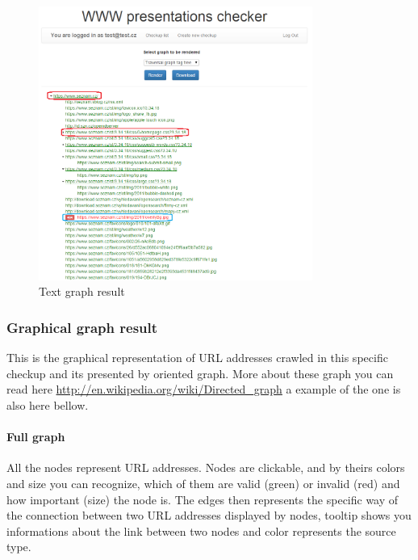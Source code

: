 \documentclass[12pt,a4paper]{article}
\begin{document}
\begin{figure}[H]
    \centering
    \includegraphics[width=0.8\textwidth]{pictures/text.png}
		\caption{Text graph result}
		\label{fig:text}
\end{figure}

\subsubsection{Graphical graph result} \label{graphical}
This is the graphical representation of URL addresses crawled in this specific checkup and its presented by oriented graph. More about these graph you can read here \url{http://en.wikipedia.org/wiki/Directed_graph} a example of the one is also here bellow.

\paragraph{Full graph} \label{full graph}
All the nodes represent URL addresses. Nodes are clickable, and by theirs colors and size you can recognize, which of them are valid (green) or invalid (red) and how important (size) the node is. The edges then represents the specific way of the connection between two URL addresses displayed by nodes, tooltip shows you informations about the link between two nodes and color represents the source type.
\end{document}
